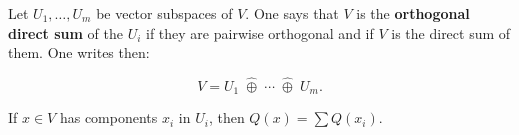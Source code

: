 Let $U_1, \ldots, U_m$ be vector subspaces of $V$. One says that $V$ is the \textbf{orthogonal direct sum} of the $U_i$ if they are pairwise orthogonal and if $V$ is the direct sum of them. One writes then:

$$V = U_1 \;\hat{\oplus}\; \cdots \;\hat{\oplus}\; U_m.$$

If $x \in V$ has components $x_i$ in $U_i$, then $Q(x) = \sum Q(x_i)$.

